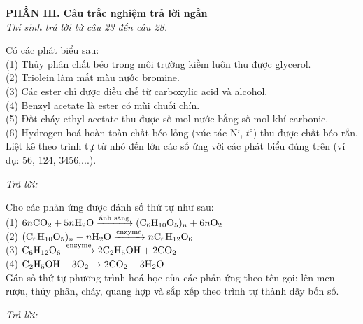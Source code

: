 \documentclass[11pt,a4paper]{article}
\begin{document}
\vspace{6pt}
\noindent
{\color{mainGreen}\textbf{\large PHẦN III. Câu trắc nghiệm trả lời ngắn}}\\
\textit{\small Thí sinh trả lời từ câu 23 đến câu 28.}
\vspace{2pt}

\begin{ex}
Có các phát biểu sau:\\
(1) Thủy phân chất béo trong môi trường kiềm luôn thu được glycerol.\\
(2) Triolein làm mất màu nước bromine.\\
(3) Các ester chỉ được điều chế từ carboxylic acid và alcohol.\\
(4) Benzyl acetate là ester có mùi chuối chín.\\
(5) Đốt cháy ethyl acetate thu được số mol nước bằng số mol khí carbonic.\\
(6) Hydrogen hoá hoàn toàn chất béo lỏng (xúc tác Ni, $t^\circ$) thu được chất béo rắn.\\
Liệt kê theo trình tự từ nhỏ đến lớn các số ứng với các phát biểu đúng trên (ví dụ: 56, 124, 3456,...).

\textit{Trả lời:} \dotfill
\end{ex}
\begin{ex}
Cho các phản ứng được đánh số thứ tự như sau:\\
(1) $6n\ce{CO2} + 5n\ce{H2O} \xrightarrow{\text{ánh sáng}} (\ce{C6H10O5})_n + 6n\ce{O2}$\\
(2) $(\ce{C6H10O5})_n + n\ce{H2O} \xrightarrow{\text{enzyme}} n\ce{C6H12O6}$\\
(3) $\ce{C6H12O6} \xrightarrow{\text{enzyme}} 2\ce{C2H5OH} + 2\ce{CO2}$\\
(4) $\ce{C2H5OH} + 3\ce{O2} \rightarrow 2\ce{CO2} + 3\ce{H2O}$\\
Gán số thứ tự phương trình hoá học của các phản ứng theo tên gọi: lên men rượu, thủy phân, cháy, quang hợp và sắp xếp theo trình tự thành dãy bốn số.

\textit{Trả lời:} \dotfill
\end{ex}
\end{document}
